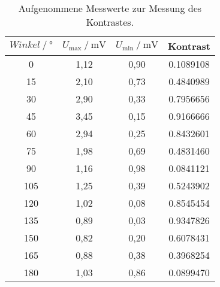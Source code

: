 \begin{table}[H] 
   \centering 
   \caption{Aufgenommene Messwerte zur Messung des Kontrastes.} 
   \label{tab:Kontrast} 
   \begin{tabular} { c c c c } 
 \toprule 
 {$Winkel\:/\: \mathrm{°}$} & {$U_\text{max}\:/\: \mathrm{mV}$} & {$U_\text{min}\:/\: \mathrm{mV}$} & {Kontrast}\\ 
    \midrule 
      0 & 1,12 & 0,90 & 0.1089108 \\ 
     15 & 2,10 & 0,73 & 0.4840989 \\ 
     30 & 2,90 & 0,33 & 0.7956656 \\ 
     45 & 3,45 & 0,15 & 0.9166666 \\ 
     60 & 2,94 & 0,25 & 0.8432601 \\ 
     75 & 1,98 & 0,69 & 0.4831460 \\ 
     90 & 1,16 & 0,98 & 0.0841121 \\ 
    105 & 1,25 & 0,39 & 0.5243902 \\ 
    120 & 1,02 & 0,08 & 0.8545454 \\ 
    135 & 0,89 & 0,03 & 0.9347826 \\ 
    150 & 0,82 & 0,20 & 0.6078431 \\ 
    165 & 0,88 & 0,38 & 0.3968254 \\ 
    180 & 1,03 & 0,86 & 0.0899470 \\ 
    \bottomrule 
  \end{tabular}
\end{table}

